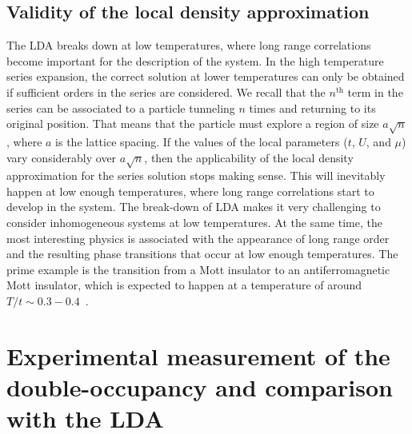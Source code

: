\documentclass[11pt,letter]{article}
\begin{document}
\subsection{Validity of the local density approximation} 

The LDA breaks down at low temperatures, where long
range correlations become important for the description of the system.   In the
high temperature series expansion, the correct solution at lower temperatures
can only be obtained if sufficient orders in the series are considered.  We
recall that the $n^{\text{th}}$ term in the series can be associated to a
particle tunneling $n$ times and returning to its original position.  That
means that the particle must explore a region of size $a\sqrt{n}$, where $a$ is
the lattice spacing.   If the values of the local parameters ($t$, $U$, and
$\mu$) vary considerably over  $a\sqrt{n}$, then the applicability of the local
density approximation for the series solution stops making sense.   This will
inevitably happen at low enough temperatures,  where long range correlations
start to develop in the system.    The break-down of LDA makes it very
challenging to consider inhomogeneous systems at low temperatures.   At the
same time,  the most interesting physics is associated with the appearance of
long range order and the resulting phase transitions that occur at low enough
temperatures.  The prime example is the transition from a Mott insulator to an
antiferromagnetic Mott insulator, which is expected to happen at a temperature
of around $T/t \sim 0.3-0.4$~\cite{Staudt2000,Kent2005,Fuchs2011,Paiva2011}. 

\section{Experimental measurement of the double-occupancy and comparison with the LDA}
\end{document}
